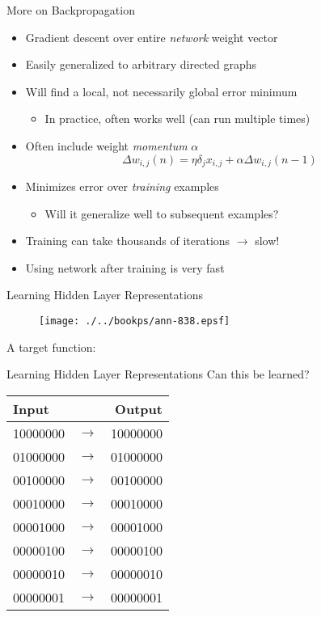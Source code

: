 \documentclass[%
pdf,
colorBG,
slideColor,
tcrico,
]{prosper}
\begin{document}
\begin{slide}{  More on Backpropagation  } 
\tiny
\begin{itemize}
\item Gradient descent over entire {\em network} weight vector
\item Easily generalized to arbitrary directed graphs
\item Will find a local, not necessarily global error minimum
	\begin{itemize} \item In practice, often works well (can run multiple times) \end{itemize}
\item Often include weight {\em momentum} $\alpha$
\[ \Delta w_{i,j}(n) = \eta \delta_{j} x_{i,j} + \alpha \Delta w_{i,j}(n-1) \]
\item Minimizes error over {\em training} examples
	\begin{itemize} \item Will it generalize well to subsequent examples? \end{itemize}
\item Training can take thousands of iterations $\rightarrow$ slow!
\item Using network after training is very fast
\end{itemize}
\end{slide}


\begin{slide}{  Learning Hidden Layer Representations  } 
\begin{figure}
	\centering
	\texttt{[image: ./../bookps/ann-838.epsf]}
\end{figure}

A target function:

\end{slide}


\begin{slide}{  Learning Hidden Layer Representations  } 
Can this be learned?
\tiny
\begin{center}
 {
\begin{tabular}{lcr} \hline
\rowcolor[HTML]{99aabb} Input & & Output \\ \hline \hline
\rowcolor[HTML]{bbccdd} 10000000 & $\rightarrow$ & 10000000 \\
\rowcolor[HTML]{ccddee} 01000000 & $\rightarrow$ & 01000000 \\
\rowcolor[HTML]{bbccdd} 00100000 & $\rightarrow$ & 00100000 \\
\rowcolor[HTML]{ccddee} 00010000 & $\rightarrow$ & 00010000 \\
\rowcolor[HTML]{bbccdd} 00001000 & $\rightarrow$ & 00001000 \\
\rowcolor[HTML]{ccddee} 00000100 & $\rightarrow$ & 00000100 \\
\rowcolor[HTML]{bbccdd} 00000010 & $\rightarrow$ & 00000010 \\
\rowcolor[HTML]{ccddee} 00000001 & $\rightarrow$ & 00000001 \\ 
\end{tabular}
}
\end{center}
\end{slide}
\end{document}
